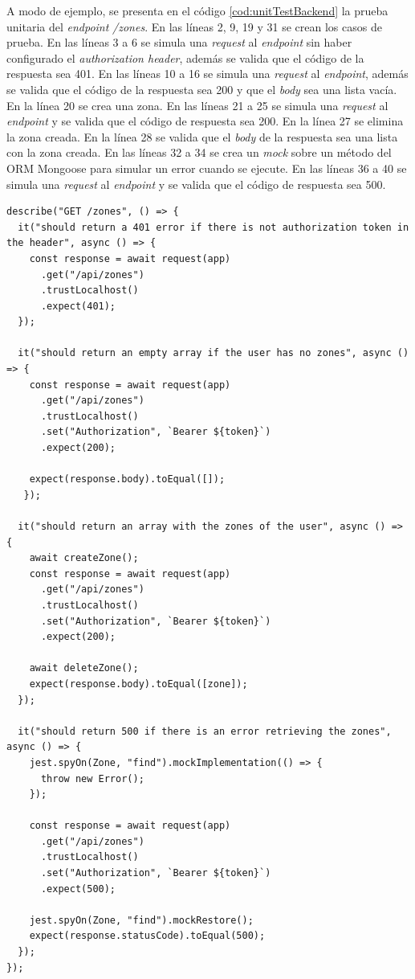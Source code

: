 A modo de ejemplo, se presenta en el código \ref{cod:unitTestBackend} la prueba unitaria del \emph{endpoint} \textit{/zones}. En las líneas 2, 9, 19 y 31 se crean los casos de prueba. En las líneas 3 a 6 se simula una \emph{request} al \emph{endpoint} sin haber configurado el \textit{authorization header}, además se valida que el código de la respuesta sea 401. En las líneas 10 a 16 se simula una \emph{request} al \emph{endpoint}, además se valida que el código de la respuesta sea 200 y que el \textit{body} sea una lista vacía. En la línea 20 se crea una zona. En las líneas 21 a 25 se simula una \emph{request} al \emph{endpoint} y se valida que el código de respuesta sea 200. En la línea 27 se elimina la zona creada. En la línea 28 se valida que el \textit{body} de la respuesta sea una lista con la zona creada. En las líneas  32 a 34 se crea un \emph{mock} sobre un método del ORM Mongoose para simular un error cuando se ejecute. En las líneas 36 a 40 se simula una \emph{request} al \emph{endpoint} y se valida que el código de respuesta sea 500.

\begin{lstlisting}[label=cod:unitTestBackend,caption=Prueba unitaria del \emph{endpoint /zones}]
describe("GET /zones", () => {
  it("should return a 401 error if there is not authorization token in the header", async () => {
    const response = await request(app)
      .get("/api/zones")
      .trustLocalhost()
      .expect(401);
  });

  it("should return an empty array if the user has no zones", async () => {
    const response = await request(app)
      .get("/api/zones")
      .trustLocalhost()
      .set("Authorization", `Bearer ${token}`)
      .expect(200);

    expect(response.body).toEqual([]);
   });

  it("should return an array with the zones of the user", async () => {
    await createZone();
    const response = await request(app)
      .get("/api/zones")
      .trustLocalhost()
      .set("Authorization", `Bearer ${token}`)
      .expect(200);

    await deleteZone();
    expect(response.body).toEqual([zone]);
  });

  it("should return 500 if there is an error retrieving the zones", async () => {
    jest.spyOn(Zone, "find").mockImplementation(() => {
      throw new Error();
    });

    const response = await request(app)
      .get("/api/zones")
      .trustLocalhost()
      .set("Authorization", `Bearer ${token}`)
      .expect(500);

    jest.spyOn(Zone, "find").mockRestore();
    expect(response.statusCode).toEqual(500);
  });
});
\end{lstlisting} 


